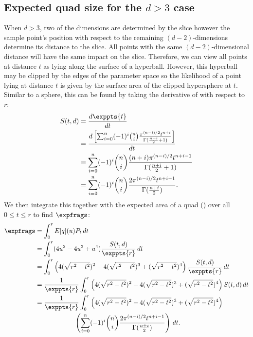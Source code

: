 \subsection{Expected quad size for the $d>3$ case}


When $d>3$, two of the dimensions are determined by the slice however the
sample point's position with respect to the remaining $(d-2)$-dimensions 
determine its distance to the slice.  All points with the same 
$(d-2)$-dimensional distance will have the same impact on the slice.
Therefore, we can view all points at distance $t$ as lying along the surface 
of a hyperball.  However, this hyperball may be clipped by the edges of the
parameter space so the likelihood of a point lying at distance $t$ is given
by the surface area of the clipped hypersphere at $t$.  Similar to a sphere,
this can be found by taking the derivative of  with 
respect to $r$:
\begin{align*}
 S(t,d) 
   &= \frac{d \exppts{t}}{d t} \\
   &= \frac{d \left[
    \sum_{i=0}^{n} (-1)^{i} {n \choose i}
         \frac{\pi^{(n-i)/2}t^{n+i}}{\Gamma(\frac{n+i}{2} + 1)} 
 \right]}{dt} \\
   &= \sum_{i=0}^{n} (-1)^{i} {n \choose i}
         \frac{(n+i)\pi^{(n-i)/2}t^{n+i-1}}{\Gamma(\frac{n+i}{2} + 1)} \\
   &= \sum_{i=0}^{n} (-1)^{i} {n \choose i}
         \frac{2\pi^{(n-i)/2}t^{n+i-1}}{\Gamma(\frac{n+i}{2})} 
         \text{.}
\end{align*}
We then integrate this
together with the expected area of a quad () over
all $0 \le t \le r$ to find $\expfrags$:
\begin{align*}
\expfrags &= \int_0^r E[q](u) P_t \, dt \\
     &= \int_0^r (4u^2 - 4u^3 + u^4)
        \frac{S(t,d)}{\exppts{r}} \, dt \\
     &= \int_0^r 
        \left(4(\sqrt{r^2-t^2})^2 - 4(\sqrt{r^2-t^2})^3 + (\sqrt{r^2-t^2})^4\right)
        \frac{S(t,d)}{\exppts{r}} \, dt \\
     &= \frac{1}{\exppts{r}} \int_0^r 
        \left(4(\sqrt{r^2-t^2})^2 - 4(\sqrt{r^2-t^2})^3 + (\sqrt{r^2-t^2})^4\right)
        S(t,d) \, dt \\
     &= \frac{1}{\exppts{r}} \int_0^r 
        \left(4(\sqrt{r^2-t^2})^2 - 4(\sqrt{r^2-t^2})^3 + (\sqrt{r^2-t^2})^4\right) \\
     &\qquad\qquad\qquad
       \left(
           \sum_{i=0}^{n} (-1)^{i} {n \choose i}
               \frac{2\pi^{(n-i)/2}t^{n+i-1}}{\Gamma(\frac{n+i}{2})} 
        \right) \, dt 
        \text{.}
\end{align*}

